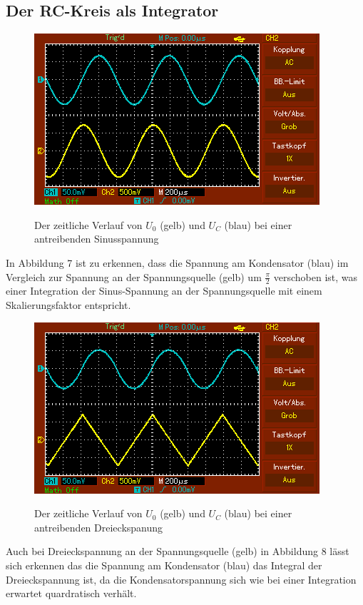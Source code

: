 	 \subsection{Der RC-Kreis als Integrator}
	 \begin{figure}[H]
	 	\centering
	 	\caption{Der zeitliche Verlauf von $U_0$ (gelb) und $U_C$ (blau) bei einer antreibenden Sinusspannung}
	 	\includegraphics[width=\linewidth-70pt,height=\textheight-70pt,keepaspectratio]{content/MAP002.png}
	 	\label{fig:Sinus}
	 \end{figure}
	 In Abbildung 7 ist zu erkennen, dass die Spannung am Kondensator (blau) im Vergleich zur Spannung an der Spannungsquelle (gelb) um $\frac{\pi}{2}$ verschoben ist, was einer Integration der Sinus-Spannung an der Spannungsquelle mit einem Skalierungsfaktor entspricht.


	 \begin{figure}[H]
	 	\centering
	 	\caption{Der zeitliche Verlauf von $U_0$ (gelb) und $U_C$ (blau) bei einer antreibenden Dreieckspanung}
	 	\includegraphics[width=\linewidth-70pt,height=\textheight-70pt,keepaspectratio]{content/MAP003.png}
	 	\label{fig:Dreieck}
	 \end{figure}
	 Auch bei Dreieckspannung an der Spannungsquelle (gelb) in Abbildung 8 lässt sich erkennen das die Spannung am Kondensator (blau) das Integral der Dreieckspannung ist, da die Kondensatorspannung sich wie bei einer Integration erwartet quardratisch verhält.

